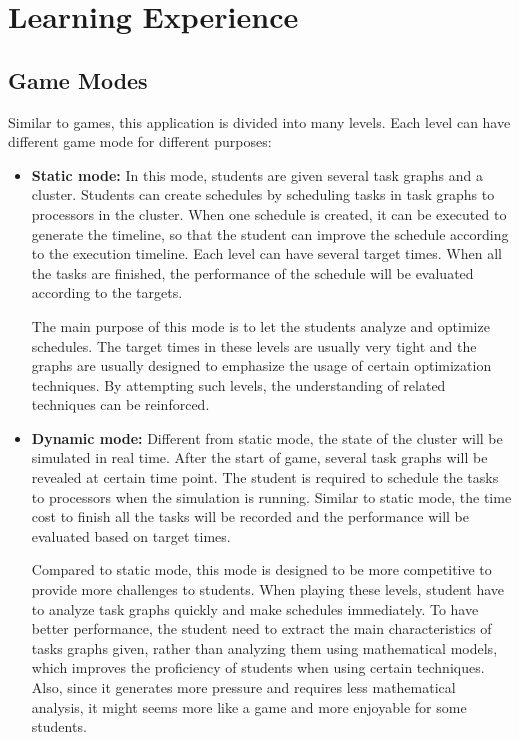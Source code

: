 \documentclass[msc,deptreport, cs]{infthesis}
\begin{document}
\section{Learning Experience}

\subsection{Game Modes}

Similar to games, this application is divided into many levels. Each level can have different game mode for different purposes:

\begin{itemize}
  \item \textbf{Static mode:} In this mode, students are given several task graphs and a cluster. Students can create schedules by scheduling tasks in task graphs to processors in the cluster. When one schedule is created, it can be executed to generate the timeline, so that the student can improve the schedule according to the execution timeline. Each level can have several target times. When all the tasks are finished, the performance of the schedule will be evaluated according to the targets.
  
  The main purpose of this mode is to let the students analyze and optimize schedules. The target times in these levels are usually very tight and the graphs are usually designed to emphasize the usage of certain optimization techniques. By attempting such levels, the understanding of related techniques can be reinforced.

  \item \textbf{Dynamic mode:} Different from static mode, the state of the cluster will be simulated in real time. After the start of game, several task graphs will be revealed at certain time point. The student is required to schedule the tasks to processors when the simulation is running. Similar to static mode, the time cost to finish all the tasks will be recorded and the performance will be evaluated based on target times.
  
  Compared to static mode, this mode is designed to be more competitive to provide more challenges to students. When playing these levels, student have to analyze task graphs quickly and make schedules immediately. To have better performance, the student need to extract the main characteristics of tasks graphs given, rather than analyzing them using mathematical models, which improves the proficiency of students when using certain techniques. Also, since it generates more pressure and requires less mathematical analysis, it might seems more like a game and more enjoyable for some students.


\end{itemize}
\end{document}
